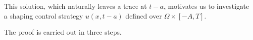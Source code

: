 \documentclass[10pt, a4]{amsart}
\makeatletter
\theoremstyle{plain}
\theoremstyle{definition}
\theoremstyle{remark}
\renewenvironment{proof}[1][\proofname]{\par
  \pushQED{\qed}%
  \normalfont \topsep6\p@\@plus6\p@\relax
  \trivlist
  \item[\hskip\labelsep
        \itshape
    #1\ \ref{#1}.]\ignorespaces
}{%
  \popQED\endtrivlist\@endpefalse
}
\numberwithin{equation}{section}
\makeatother
\begin{document}
This solution, which naturally leaves a trace at $t-a$, motivates us to investigate a shaping control strategy $u(x,t-a)$  defined over 
 $\Omega\times [-A,T].$ 
\begin{proof}[of Theorem \ref{th1.4}] 
The proof is carried out in three steps.


\end{proof}
\end{document}
